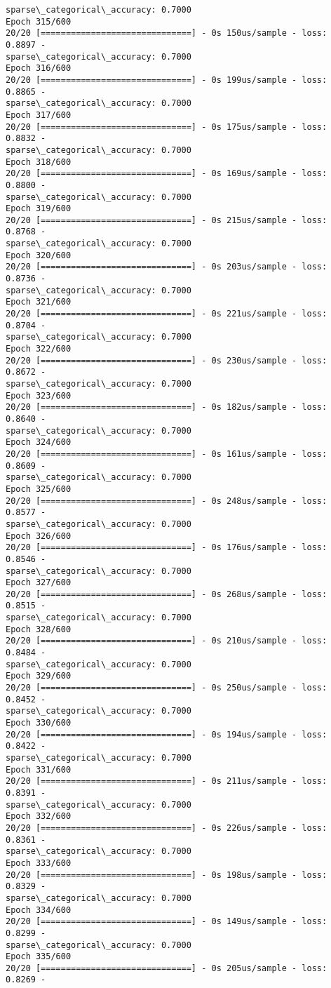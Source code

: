 \documentclass[11pt]{article}
\begin{document}
\begin{Verbatim}[commandchars=\\\{\}]
sparse\_categorical\_accuracy: 0.7000
Epoch 315/600
20/20 [==============================] - 0s 150us/sample - loss: 0.8897 -
sparse\_categorical\_accuracy: 0.7000
Epoch 316/600
20/20 [==============================] - 0s 199us/sample - loss: 0.8865 -
sparse\_categorical\_accuracy: 0.7000
Epoch 317/600
20/20 [==============================] - 0s 175us/sample - loss: 0.8832 -
sparse\_categorical\_accuracy: 0.7000
Epoch 318/600
20/20 [==============================] - 0s 169us/sample - loss: 0.8800 -
sparse\_categorical\_accuracy: 0.7000
Epoch 319/600
20/20 [==============================] - 0s 215us/sample - loss: 0.8768 -
sparse\_categorical\_accuracy: 0.7000
Epoch 320/600
20/20 [==============================] - 0s 203us/sample - loss: 0.8736 -
sparse\_categorical\_accuracy: 0.7000
Epoch 321/600
20/20 [==============================] - 0s 221us/sample - loss: 0.8704 -
sparse\_categorical\_accuracy: 0.7000
Epoch 322/600
20/20 [==============================] - 0s 230us/sample - loss: 0.8672 -
sparse\_categorical\_accuracy: 0.7000
Epoch 323/600
20/20 [==============================] - 0s 182us/sample - loss: 0.8640 -
sparse\_categorical\_accuracy: 0.7000
Epoch 324/600
20/20 [==============================] - 0s 161us/sample - loss: 0.8609 -
sparse\_categorical\_accuracy: 0.7000
Epoch 325/600
20/20 [==============================] - 0s 248us/sample - loss: 0.8577 -
sparse\_categorical\_accuracy: 0.7000
Epoch 326/600
20/20 [==============================] - 0s 176us/sample - loss: 0.8546 -
sparse\_categorical\_accuracy: 0.7000
Epoch 327/600
20/20 [==============================] - 0s 268us/sample - loss: 0.8515 -
sparse\_categorical\_accuracy: 0.7000
Epoch 328/600
20/20 [==============================] - 0s 210us/sample - loss: 0.8484 -
sparse\_categorical\_accuracy: 0.7000
Epoch 329/600
20/20 [==============================] - 0s 250us/sample - loss: 0.8452 -
sparse\_categorical\_accuracy: 0.7000
Epoch 330/600
20/20 [==============================] - 0s 194us/sample - loss: 0.8422 -
sparse\_categorical\_accuracy: 0.7000
Epoch 331/600
20/20 [==============================] - 0s 211us/sample - loss: 0.8391 -
sparse\_categorical\_accuracy: 0.7000
Epoch 332/600
20/20 [==============================] - 0s 226us/sample - loss: 0.8361 -
sparse\_categorical\_accuracy: 0.7000
Epoch 333/600
20/20 [==============================] - 0s 198us/sample - loss: 0.8329 -
sparse\_categorical\_accuracy: 0.7000
Epoch 334/600
20/20 [==============================] - 0s 149us/sample - loss: 0.8299 -
sparse\_categorical\_accuracy: 0.7000
Epoch 335/600
20/20 [==============================] - 0s 205us/sample - loss: 0.8269 -

\end{Verbatim}
\end{document}
